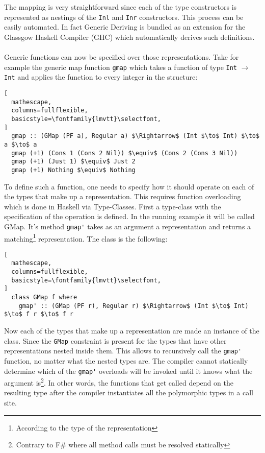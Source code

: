\documentclass[8pt]{extarticle}
\begin{document}
The mapping is very straightforward since each of the type constructors is represented as nestings of the \verb+Inl+ and \verb+Inr+ constructors. This process can be easily automated. In fact Generic Deriving\cite{GenericDeriving} is bundled as an extension for the Glassgow Haskell Compiler (GHC) which automatically derives such definitions.
\\\\Generic functions can now be specified over those representations. Take for example the generic map function \verb+gmap+ which takes a function of type \verb+Int+ $\rightarrow$ \verb+Int+ and applies the function to every integer in the structure:
\begin{lstlisting}[
  mathescape,
  columns=fullflexible,
  basicstyle=\fontfamily{lmvtt}\selectfont,
]
  gmap :: (GMap (PF a), Regular a) $\Rightarrow$ (Int $\to$ Int) $\to$ a $\to$ a
  gmap (+1) (Cons 1 (Cons 2 Nil)) $\equiv$ (Cons 2 (Cons 3 Nil))
  gmap (+1) (Just 1) $\equiv$ Just 2
  gmap (+1) Nothing $\equiv$ Nothing
\end{lstlisting}
To define such a function, one needs to specify how it should operate on each of the types that make up a representation. This requires function overloading which is done in Haskell via Type-Classes. First a type-class with the specification of the operation is defined. In the running example it will be called GMap. It's method \verb+gmap'+ takes as an argument a representation and returns a matching\footnote{According to the type of the representation} representation. The class is the following:
\begin{lstlisting}[
  mathescape,
  columns=fullflexible,
  basicstyle=\fontfamily{lmvtt}\selectfont,
]
  class GMap f where
    gmap' :: (GMap (PF r), Regular r) $\Rightarrow$ (Int $\to$ Int) $\to$ f r $\to$ f r
\end{lstlisting}
Now each of the types that make up a representation are made an instance of the class. Since the \verb+GMap+ constraint is present for the types that have other representations nested inside them. This allows to recursively call the \verb+gmap'+ function, no matter what the nested types are. The compiler cannot statically determine which of the \verb+gmap'+ overloads will be invoked until it knows what the argument is\footnote{Contrary to F\# where all method calls must be resolved statically}. In other words, the functions that get called depend on the resulting type after the compiler instantiates all the polymorphic types in a call site.
\end{document}
